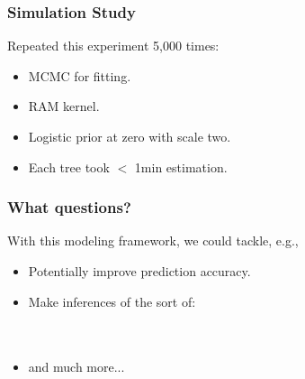 \documentclass[aspectratio=169, 9pt]{beamer}
\begin{document}
\begin{frame}
\frametitle{Simulation Study}

\begin{minipage}[c]{.40\linewidth}
Repeated this experiment 5,000 times:
    \begin{itemize}
        \item MCMC for fitting.
        \item RAM kernel.
        \item Logistic prior at zero with scale two.
        \item Each tree took $<$ 1min estimation.
    \end{itemize}
\end{minipage}\hfill
\begin{minipage}[c]{.59\linewidth}
\end{minipage}
	
\end{frame}

\begin{frame}
\frametitle{What questions?}

With this modeling framework, we could tackle, e.g.,

\begin{itemize}
    \item<2-> Potentially improve prediction accuracy.
    \item<3-> Make inferences of the sort of:\\
     \\
    \\
    \item<7-> and much more...
\end{itemize}
    
\end{frame}
\end{document}
